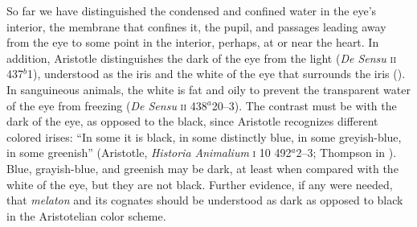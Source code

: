 So far we have distinguished the condensed and confined water in the eye's interior, the membrane that confines it, the pupil, and passages leading away from the eye to some point in the interior, perhaps, at or near the heart. In addition, Aristotle distinguishes the dark of the eye from the light (\emph{De Sensu} \textsc{ii} 437\( ^{b} \)1), understood as the iris and the white of the eye that surrounds the iris (\citealt[see][218, 231 n13]{Lloyd:1978fk}). In sanguineous animals, the white is fat and oily to prevent the transparent water of the eye from freezing (\emph{De Sensu} \textsc{ii} 438\( ^{a} \)20--3). The contrast must be with the dark of the eye, as opposed to the black, since Aristotle recognizes different colored irises: ``In some it is black, in some distinctly blue, in some greyish-blue, in some greenish'' (Aristotle, \emph{Historia Animalium} \textsc{i} 10 492\( ^{a} \)2--3; Thompson in \citealt[13]{Barnes:1984uq}). Blue, grayish-blue, and greenish may be dark, at least when compared with the white of the eye, but they are not black. Further evidence, if any were needed, that \emph{melaton} and its cognates should be understood as dark as opposed to black in the Aristotelian color scheme.



